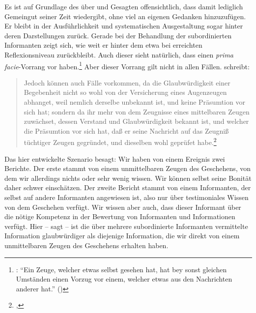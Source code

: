 Es ist auf Grundlage des über
 und
 Gesagten offensichtlich, dass
 damit lediglich Gemeingut seiner Zeit wiedergibt, ohne viel an eigenen Gedanken
hinzuzufügen.\label{AbschnittzuCrusiusundKritischemJournalismus}
Er bleibt in der Ausführlichkeit und systematischen Ausgestaltung sogar
hinter deren Darstellungen zurück.
Gerade bei der Behandlung der subordinierten Informanten zeigt sich, wie weit er
hinter dem etwa bei 
erreichten Reflexionsniveau zurückbleibt. Auch dieser sieht natürlich, dass
 einen \emph{prima facie}-Vorrang vor
haben.\footnote{\cite[Vgl.][\S~621]{Crusius:WegzurGewissheitundZuverlaessigkeitdermenschlichenErkenntniss1965}:
\enquote{Ein Zeuge, welcher etwas selbst gesehen  hat, hat bey sonst gleichen
Umständen einen Vorzug vor einem, welcher etwas aus den Nachrichten anderer
hat.} (\ohio)} Aber dieser Vorrang gilt nicht in allen Fällen.
 schreibt:
\begin{quote}
  Jedoch können auch Fälle vorkommen, da die Glaubwürdigkeit einer Begebenheit
  nicht so wohl von der Versicherung eines Augenzeugen abhanget, weil nemlich
  derselbe unbekannt ist, und keine Präsumtion vor sich hat; sondern da ihr mehr
  von dem Zeugnisse eines mittelbaren Zeugen zuwächset, dessen Verstand und
  Glaubwürdigkeit bekannt ist, und welcher die Präsumtion vor sich hat, daß er
  seine Nachricht auf das Zeugniß tüchtiger Zeugen gegründet, und dieselben wohl
  geprüfet
  habe.\footnote{\Cite[][\S~621]{Crusius:WegzurGewissheitundZuverlaessigkeitdermenschlichenErkenntniss1965},
  \ohio}
\end{quote}
Das hier entwickelte Szenario besagt: Wir haben von einem Ereignis zwei
Berichte. Der erste stammt von einem unmittelbaren Zeugen des Geschehens, von
dem wir allerdings nichts oder sehr wenig wissen. Wir können selbst seine
Bonität daher schwer einschätzen. Der zweite Bericht stammt von einem
Informanten, der selbst auf andere Informanten angewiesen ist, also nur über
testimoniales Wissen von dem Geschehen verfügt. Wir wissen aber auch, dass
dieser Informant über die nötige Kompetenz in der Bewertung von Informanten und
Informationen verfügt. Hier -- sagt
 -- ist die über mehrere
subordinierte Informanten vermittelte Information glaubwürdiger als diejenige
Information, die wir direkt von einem unmittelbaren Zeugen des Geschehens
erhalten haben.

